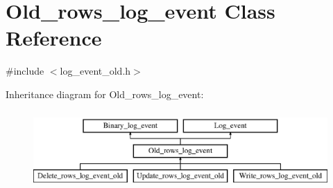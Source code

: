 \hypertarget{classOld__rows__log__event}{}\section{Old\+\_\+rows\+\_\+log\+\_\+event Class Reference}
\label{classOld__rows__log__event}


{\ttfamily \#include $<$log\+\_\+event\+\_\+old.\+h$>$}

Inheritance diagram for Old\+\_\+rows\+\_\+log\+\_\+event\+:\begin{figure}[H]
\begin{center}
\leavevmode
\includegraphics[height=3.000000cm]{classOld__rows__log__event}
\end{center}
\end{figure}
